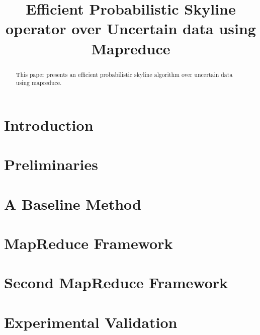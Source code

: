 \documentclass[10pt,conference,letterpaper]{IEEEtran}
\begin{document}
\title{Efficient Probabilistic Skyline operator over Uncertain data using Mapreduce}


\maketitle

\begin{abstract}
This paper presents an efficient probabilistic skyline algorithm over uncertain data using mapreduce.
\end{abstract}

\section{Introduction}\label{sec:intro}


\section{Preliminaries}\label{sec:prelim}


\section{A Baseline Method}\label{sec:naive}

%
%
%
\section{MapReduce Framework}\label{sec:mapreduce}


\section{Second MapReduce Framework}\label{sec:second}


\section{Experimental Validation}\label{sec:expr}




%


%

\small


\end{document}
